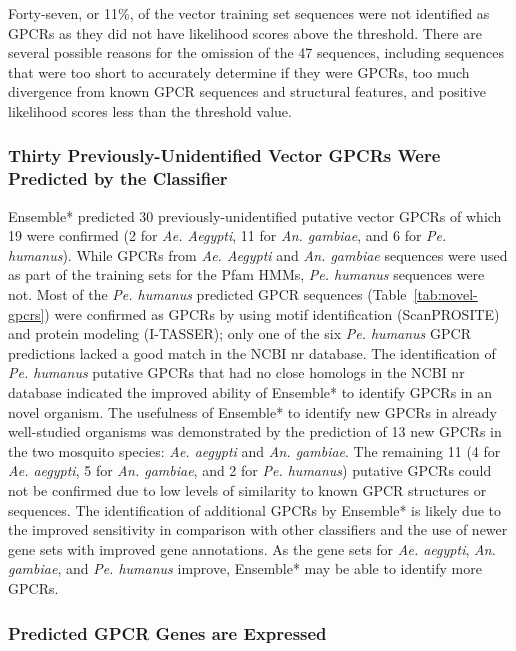 Forty-seven, or 11\%, of the vector training set sequences were not identified as GPCRs as they did not have likelihood scores above the threshold. There are several possible reasons for the omission of the 47 sequences, including sequences that were too short to accurately determine if they were GPCRs, too much divergence from known GPCR sequences and structural features, and positive likelihood scores less than the threshold value.


\subsubsection{Thirty Previously-Unidentified Vector GPCRs Were Predicted by the Classifier}

Ensemble* predicted 30 previously-unidentified putative vector GPCRs of which 19 were confirmed (2 for \emph{Ae. Aegypti}, 11 for \emph{An. gambiae}, and 6 for \emph{Pe. humanus}).  While GPCRs from \emph{Ae. Aegypti} and \emph{An. gambiae} sequences were used as part of the training sets for the Pfam HMMs, \emph{Pe. humanus} sequences were not.  Most of the \emph{Pe. humanus} predicted GPCR sequences (Table~\ref{tab:novel-gpcrs}) were confirmed as GPCRs by using motif identification (ScanPROSITE) and protein modeling (I-TASSER); only one of the six \emph{Pe. humanus} GPCR predictions lacked a good match in the NCBI nr database. The identification of \emph{Pe. humanus} putative GPCRs that had no close homologs in the NCBI nr database indicated the improved ability of Ensemble* to identify GPCRs in an novel organism. The usefulness of Ensemble* to identify new GPCRs in already well-studied organisms was demonstrated by the prediction of 13 new GPCRs in the two mosquito species: \emph{Ae. aegypti}  and \emph{An. gambiae}.  The remaining 11 (4 for \emph{Ae. aegypti}, 5 for \emph{An. gambiae}, and 2 for \emph{Pe. humanus}) putative GPCRs could not be confirmed due to low levels of similarity to known GPCR structures or sequences. The identification of additional GPCRs by Ensemble* is likely due to the improved sensitivity in comparison with other classifiers and the use of newer gene sets with improved gene annotations. As the gene sets for \emph{Ae. aegypti}, \emph{An. gambiae}, and \emph{Pe. humanus} improve, Ensemble* may be able to identify more GPCRs.

\subsubsection{Predicted GPCR Genes are Expressed}

